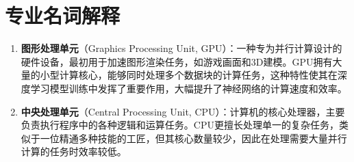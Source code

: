 \chapter{专业名词解释}

\begin{enumerate}

\item \textbf{图形处理单元}（Graphics Processing Unit, GPU）：一种专为并行计算设计的硬件设备，最初用于加速图形渲染任务，如游戏画面和3D建模。GPU拥有大量的小型计算核心，能够同时处理多个数据块的计算任务，这种特性使其在深度学习模型训练中发挥了重要作用，大幅提升了神经网络的计算速度和效率。

\item \textbf{中央处理单元}（Central Processing Unit, CPU）：计算机的核心处理器，主要负责执行程序中的各种逻辑和运算任务。CPU更擅长处理单一的复杂任务，类似于一位精通多种技能的工匠，但其核心数量较少，因此在处理需要大量并行计算的任务时效率较低。


\end{enumerate}
